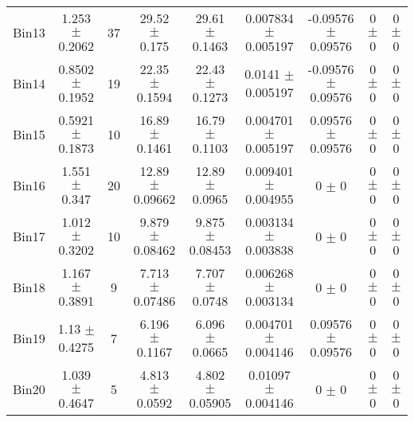 \begin{tabular}{@{\extracolsep{4pt}}lcccccccc@{}}
     Bin13 & 1.253 $\pm$ 0.2062 & 37 & 29.52 $\pm$ 0.175 & 29.61 $\pm$ 0.1463 & 0.007834 $\pm$ 0.005197 & -0.09576 $\pm$ 0.09576 & 0 $\pm$ 0 & 0 $\pm$ 0 \\ 
     Bin14 & 0.8502 $\pm$ 0.1952 & 19 & 22.35 $\pm$ 0.1594 & 22.43 $\pm$ 0.1273 & 0.0141 $\pm$ 0.005197 & -0.09576 $\pm$ 0.09576 & 0 $\pm$ 0 & 0 $\pm$ 0 \\ 
     Bin15 & 0.5921 $\pm$ 0.1873 & 10 & 16.89 $\pm$ 0.1461 & 16.79 $\pm$ 0.1103 & 0.004701 $\pm$ 0.005197 & 0.09576 $\pm$ 0.09576 & 0 $\pm$ 0 & 0 $\pm$ 0 \\ 
     Bin16 & 1.551 $\pm$ 0.347 & 20 & 12.89 $\pm$ 0.09662 & 12.89 $\pm$ 0.0965 & 0.009401 $\pm$ 0.004955 & 0 $\pm$ 0 & 0 $\pm$ 0 & 0 $\pm$ 0 \\ 
     Bin17 & 1.012 $\pm$ 0.3202 & 10 & 9.879 $\pm$ 0.08462 & 9.875 $\pm$ 0.08453 & 0.003134 $\pm$ 0.003838 & 0 $\pm$ 0 & 0 $\pm$ 0 & 0 $\pm$ 0 \\ 
     Bin18 & 1.167 $\pm$ 0.3891 & 9 & 7.713 $\pm$ 0.07486 & 7.707 $\pm$ 0.0748 & 0.006268 $\pm$ 0.003134 & 0 $\pm$ 0 & 0 $\pm$ 0 & 0 $\pm$ 0 \\ 
     Bin19 & 1.13 $\pm$ 0.4275 & 7 & 6.196 $\pm$ 0.1167 & 6.096 $\pm$ 0.0665 & 0.004701 $\pm$ 0.004146 & 0.09576 $\pm$ 0.09576 & 0 $\pm$ 0 & 0 $\pm$ 0 \\ 
     Bin20 & 1.039 $\pm$ 0.4647 & 5 & 4.813 $\pm$ 0.0592 & 4.802 $\pm$ 0.05905 & 0.01097 $\pm$ 0.004146 & 0 $\pm$ 0 & 0 $\pm$ 0 & 0 $\pm$ 0 \\ 
\hline\hline
  \end{tabular}
